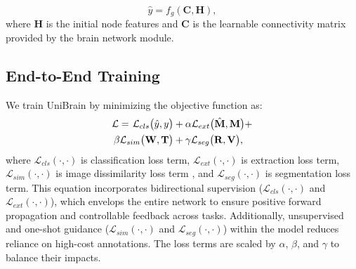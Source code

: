 \begin{equation}
\hat{y} = f_g(\mathbf{C},\mathbf{H}),
\end{equation}
where $\mathbf{H}$ is the initial node features and $\mathbf{C}$ is the learnable connectivity matrix provided by the brain network module.

\vspace{-3pt}
\subsection{End-to-End Training}
\label{section:end-to-end training}

We train UniBrain by minimizing the objective function as: 
\begin{equation}
\label{eq:optimization}
\begin{aligned}
\mathcal{L} = \hspace{+1pt} \mathcal{L}_{cls}\big(\hat{y}, y\big)  & + \alpha \mathcal{L}_{ext}\big(\hat{\mathbf{M}}, \mathbf{M}\big)   + \\ \beta  \mathcal{L}_{sim}\big(\mathbf{W}, \mathbf{T}\big)   & + \gamma \mathcal{L}_{seg}\big({\mathbf{R}}, \mathbf{V}\big),
\end{aligned}
\end{equation}
where $\mathcal{L}_{cls}(\cdot, \cdot)$ is classification loss term, $\mathcal{L}_{ext}(\cdot, \cdot)$ is extraction loss term, $\mathcal{L}_{sim}(\cdot, \cdot)$ is image dissimilarity loss term , and $\mathcal{L}_{seg}(\cdot, \cdot)$ is segmentation loss term.
This equation incorporates bidirectional supervision ($\mathcal{L}_{cls}(\cdot, \cdot)$ and $\mathcal{L}_{ext}(\cdot, \cdot)$), which envelops the entire network to ensure positive forward propagation and controllable feedback across tasks. Additionally, unsupervised and one-shot guidance ($\mathcal{L}_{sim}(\cdot, \cdot)$ and $\mathcal{L}_{seg}(\cdot, \cdot)$) within the model reduces reliance on high-cost annotations. 
The loss terms are scaled by $\alpha$, $\beta$, and $\gamma$ to balance their impacts. 

